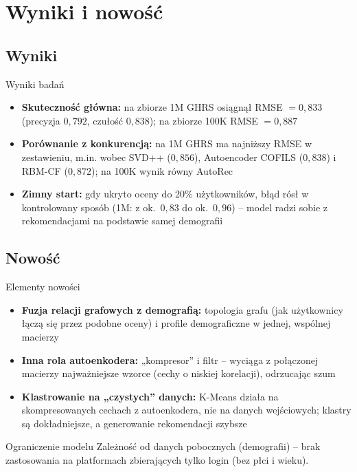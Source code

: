 \documentclass[red]{beamer}
\begin{document}
    \section{Wyniki i nowość}
    \subsection{Wyniki}
    \begin{frame}{Wyniki badań}
        \small
        \begin{itemize}
            \item \textbf{Skuteczność główna:} na zbiorze 1M GHRS osiągnął RMSE $=0{,}833$ (precyzja $0{,}792$, czułość $0{,}838$); na zbiorze 100K RMSE $=0{,}887$
            \item \textbf{Porównanie z konkurencją:} na 1M GHRS ma najniższy RMSE w zestawieniu, m.in. wobec SVD++ ($0{,}856$), Autoencoder COFILS ($0{,}838$) i RBM-CF ($0{,}872$); na 100K wynik równy AutoRec
            \item \textbf{Zimny start:} gdy ukryto oceny do 20\% użytkowników, błąd rósł w kontrolowany sposób (1M: z ok.\ $0{,}83$ do ok.\ $0{,}96$) -- model radzi sobie z rekomendacjami na podstawie samej demografii
        \end{itemize}
    \end{frame}

    \subsection{Nowość}
    \begin{frame}{Elementy nowości}
        \footnotesize
        \begin{itemize}
            \item \textbf{Fuzja relacji grafowych z demografią:} topologia grafu (jak użytkownicy łączą się przez podobne oceny) i profile demograficzne w jednej, wspólnej macierzy
            \item \textbf{Inna rola autoenkodera:} „kompresor” i filtr -- wyciąga z połączonej macierzy najważniejsze wzorce (cechy o niskiej korelacji), odrzucając szum
            \item \textbf{Klastrowanie na „czystych” danych:} K-Means działa na skompresowanych cechach z autoenkodera, nie na danych wejściowych; klastry są dokładniejsze, a generowanie rekomendacji szybsze
        \end{itemize}
        \begin{alertblock}{Ograniczenie modelu}
            Zależność od danych pobocznych (demografii) -- brak zastosowania na platformach zbierających tylko login (bez płci i wieku).
        \end{alertblock}
    \end{frame}
\end{document}
